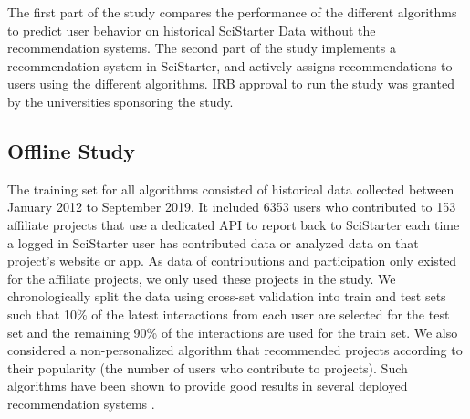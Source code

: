 \documentclass[letterpaper]{article} %
\begin{document}
%




  The first part of the study compares the performance of the different algorithms to predict
  user behavior on historical
 SciStarter Data without the recommendation systems.  The second part of the study
 implements a recommendation system in SciStarter, and
 actively  assigns recommendations to users using the different algorithms.
 IRB approval to run the study was granted by the universities sponsoring the study.

 \subsection{Offline Study}

 The  training set for all algorithms consisted of historical   data  collected between January 2012 to September 2019. It included 6353 users who contributed to 153 affiliate  projects that use a dedicated  API to report back to SciStarter each time a logged in SciStarter user has contributed data or analyzed data on that project’s website or app. As data of contributions and participation only existed for the affiliate projects, we only used these projects in the study.
We chronologically split the data using cross-set validation into train and test sets such that 10\% of the latest interactions from each user are selected for the test set and the remaining 90\% of the interactions are used for the train set.
We also considered a non-personalized  algorithm that recommended projects according to their popularity (the number of users who contribute to  projects). Such algorithms have been shown to provide   good results in several deployed
recommendation systems \cite{ahn2006utilizing,jonnalagedda2016incorporating}.
\end{document}
